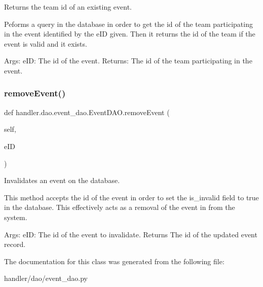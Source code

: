 \begin{DoxyVerb}Returns the team id of an existing event.

Peforms a query in the database in order to 
get the id of the team participating in the
event identified by the eID given. Then it 
returns the id of the team if the event is 
valid and it exists.

Args:
    eID: The id of the event.
Returns:
    The id of the team participating in the
    event.\end{DoxyVerb}
 \mbox{\label{classhandler_1_1dao_1_1event__dao_1_1_event_d_a_o_a3d8c4ff8a724203eeacb90e6cb84450e}} 
\subsubsection{\texorpdfstring{remove\+Event()}{removeEvent()}}
{\footnotesize\ttfamily def handler.\+dao.\+event\+\_\+dao.\+Event\+D\+A\+O.\+remove\+Event (\begin{DoxyParamCaption}\item[{}]{self,  }\item[{}]{e\+ID }\end{DoxyParamCaption})}

\begin{DoxyVerb}Invalidates an event on the database.

This method accepts the id of the event in order
to set the is_invalid field to true in the database.
This effectively acts as a removal of the event in 
from the system.

Args:
    eID: The id of the event to invalidate.
Returns
    The id of the updated event record.
\end{DoxyVerb}
 

The documentation for this class was generated from the following file\+:\begin{DoxyCompactItemize}
\item 
handler/dao/event\+\_\+dao.\+py\end{DoxyCompactItemize}
